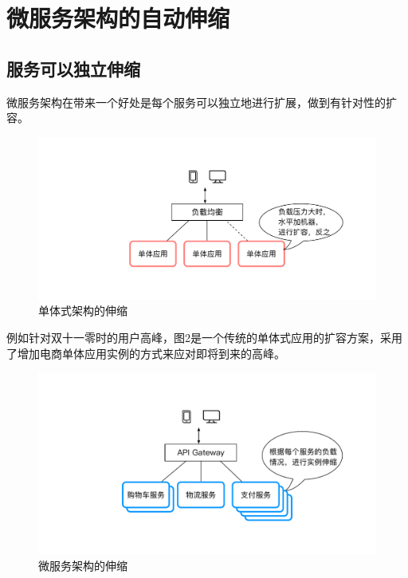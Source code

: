 \documentclass[10.5pt,twocolumn]{jbuaa}
\begin{document}





\section{微服务架构的自动伸缩}
\subsection{服务可以独立伸缩}
微服务架构在带来一个好处是每个服务可以独立地进行扩展，做到有针对性的扩容。
\begin{figure}[H]
\centering
\includegraphics [scale=0.4,trim=0 0 0 0]{./image/2.pdf}
\caption{单体式架构的伸缩}
\end{figure}

例如针对双十一零时的用户高峰，图2是一个传统的单体式应用的扩容方案，采用了增加电商单体应用实例的方式来应对即将到来的高峰。
\begin{figure}[H]
\centering
\includegraphics [scale=0.4,trim=0 0 0 0]{./image/3.pdf}
\caption{微服务架构的伸缩}
\end{figure}
\end{document}
